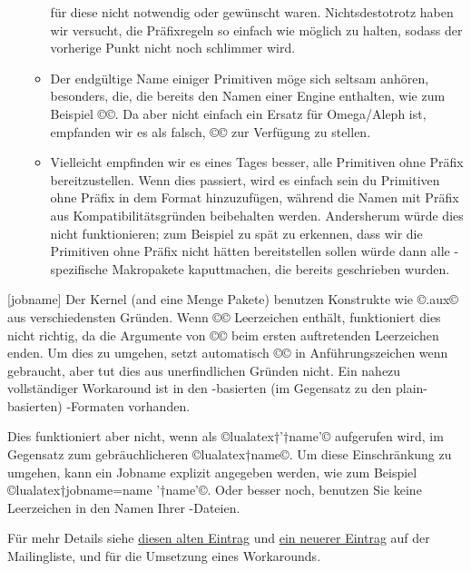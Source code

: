 \documentclass{lltxdoc}
\begin{document}
\begin{myquote}
\begin{enumerate}
\begin{itemize}
für diese nicht notwendig oder gewünscht waren. Nichtsdestotrotz haben wir 
versucht, die Präfixregeln so einfach wie möglich zu halten, sodass der 
vorherige Punkt nicht noch schlimmer wird.
         \item Der endgültige Name einiger Primitiven möge sich seltsam anhören,
 besonders, die, die bereits den Namen einer Engine enthalten, wie zum Beispiel 
©\luatexOmegaVersion©. Da aber \luatex nicht einfach ein Ersatz für Omega/Aleph 
ist, empfanden wir es als falsch, ©\OmegaVersion© zur Verfügung zu stellen.
          \item Vielleicht empfinden wir es eines Tages besser, alle Primitiven 
ohne Präfix bereitzustellen. Wenn dies passiert, wird es einfach sein du 
Primitiven ohne Präfix in dem Format hinzuzufügen, während die Namen mit Präfix 
aus Kompatibilitätsgründen beibehalten werden. Andersherum würde dies nicht 
funktionieren; zum Beispiel zu spät zu erkennen, dass wir die Primitiven ohne 
Präfix nicht hätten bereitstellen sollen würde dann alle \luatex-spezifische 
Makropakete kaputtmachen, die bereits geschrieben wurden.
      \end{itemize}
  \end{enumerate}
\end{myquote}

[jobname]
Der \latex Kernel (and eine Menge Pakete) benutzen Konstrukte wie 
©\jobname.aux© aus verschiedensten Gründen. Wenn ©\jobname©  Leerzeichen 
enthält, funktioniert dies nicht richtig, da die Argumente von ©© beim 
ersten auftretenden Leerzeichen enden. Um dies zu umgehen, setzt \pdftex 
automatisch ©\jobname© in Anführungszeichen wenn gebraucht, aber \luatex tut 
dies aus unerfindlichen Gründen nicht. Ein nahezu vollständiger Workaround ist 
in den \latex-basierten (im Gegensatz zu den plain-basierten) \luatex-Formaten 
vorhanden. 

Dies funktioniert aber nicht, wenn \luatex als ©lualatex†'†name'© 
aufgerufen wird, im Gegensatz zum gebräuchlicheren ©lualatex†name©. Um diese 
Einschränkung zu umgehen, kann ein Jobname explizit angegeben werden, wie zum 
Beispiel ©lualatex†jobname=name '†name'©. Oder besser noch, benutzen Sie 
keine Leerzeichen in den Namen Ihrer \tex-Dateien.

Für mehr Details siehe
\href{http://www.ntg.nl/pipermail/dev-luatex/2009-April/002549.html}{diesen 
alten Eintrag} und
\href{http://tug.org/pipermail/luatex/2010-August/001986.html}{ein neuerer 
Eintrag}
auf der \luatex Mailingliste, und  für die 
Umsetzung eines Workarounds.
\end{document}
